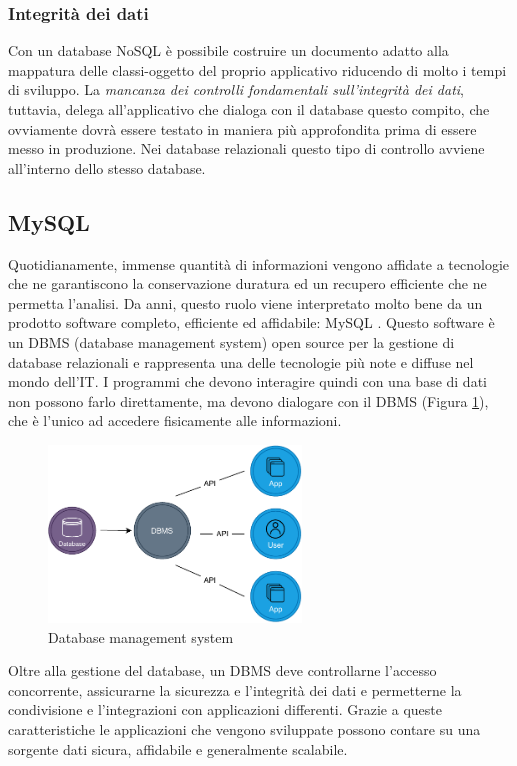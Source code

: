 \subsubsection{Integrità dei dati}
Con un database NoSQL è possibile costruire un documento adatto alla mappatura delle classi-oggetto del proprio applicativo riducendo di molto i tempi di sviluppo. La \textit{mancanza dei controlli fondamentali sull'integrità dei dati}, tuttavia, delega all'applicativo che dialoga con il database questo compito, che ovviamente dovrà essere testato in maniera più approfondita prima di essere messo in produzione. Nei database relazionali questo tipo di controllo avviene all'interno dello stesso database. 

\subsection{MySQL}
Quotidianamente, immense quantità di informazioni vengono affidate a tecnologie che ne garantiscono la conservazione duratura ed un recupero efficiente che ne permetta l’analisi. Da anni, questo ruolo viene interpretato molto bene da un prodotto software completo, efficiente ed affidabile: MySQL \cite{site:mysql} . Questo software è un DBMS (database management system) open source per la gestione di database relazionali e rappresenta una delle tecnologie più note e diffuse nel mondo dell'IT. I programmi che devono interagire quindi con una base di dati non possono farlo direttamente, ma devono dialogare con il DBMS (Figura \ref{fig:databasemanagementsystem}), che è l’unico ad accedere fisicamente alle informazioni.
\begin{figure}[H]
    \centering
    \includegraphics[width=0.60\textwidth]{images/01_6_dbms.pdf}
    \caption{Database management system}
    \label{fig:databasemanagementsystem}
\end{figure}
Oltre alla gestione del database, un DBMS deve controllarne l'accesso concorrente, assicurarne la sicurezza e l'integrità dei dati e permetterne la condivisione e l'integrazioni con applicazioni differenti. Grazie a queste caratteristiche le applicazioni che vengono sviluppate possono contare su una sorgente dati sicura, affidabile e generalmente scalabile.

